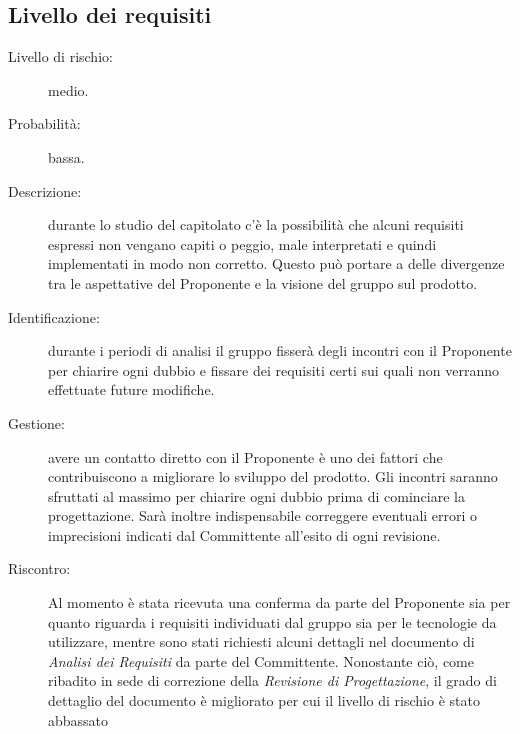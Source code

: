 \subsection{Livello dei requisiti}
\begin{description}
	\item[Livello di rischio:] medio.
	\item[Probabilità:] bassa.
	\item[Descrizione:] durante lo studio del capitolato c'è la possibilità che alcuni requisiti espressi non vengano capiti o peggio, male interpretati e quindi implementati in modo non corretto. Questo può portare a delle divergenze tra le aspettative del Proponente e la visione del gruppo sul prodotto. 
	\item[Identificazione:] durante i periodi di analisi il gruppo fisserà degli incontri con il Proponente per chiarire ogni dubbio e fissare dei requisiti certi sui quali non verranno effettuate future modifiche.
	\item[Gestione:] avere un contatto diretto con il Proponente è uno dei fattori che contribuiscono a migliorare lo sviluppo del prodotto. Gli incontri saranno sfruttati al massimo per chiarire ogni dubbio prima di cominciare la progettazione. Sarà inoltre indispensabile correggere eventuali errori o imprecisioni indicati dal Committente all'esito di ogni revisione.
	\item[Riscontro:] Al momento è stata ricevuta una conferma da parte del Proponente sia per quanto riguarda i requisiti individuati dal gruppo sia per le tecnologie da utilizzare, mentre sono stati richiesti alcuni dettagli nel documento di \textit{Analisi dei Requisiti} da parte del Committente. Nonostante ciò, come ribadito in sede di correzione della \textit{Revisione di Progettazione}, il grado di dettaglio del documento è migliorato per cui il livello di rischio è stato abbassato
\end{description}

